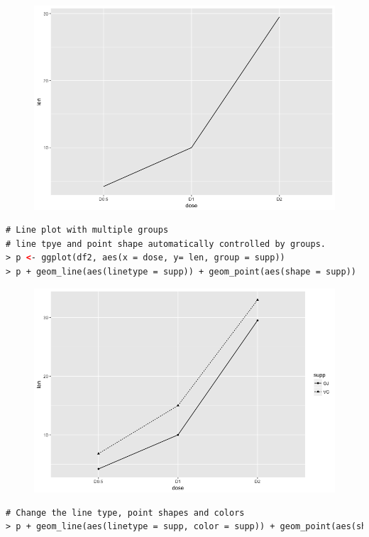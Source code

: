 \begin{figure}[H]\begin{center}\includegraphics[scale=1 ]{ilu/bg122.png}\end{center}\end{figure}
\begin{lstlisting}[language=html]
# Line plot with multiple groups
# line tpye and point shape automatically controlled by groups.
> p <- ggplot(df2, aes(x = dose, y= len, group = supp))
> p + geom_line(aes(linetype = supp)) + geom_point(aes(shape = supp))
\end{lstlisting}
\begin{figure}[H]\begin{center}\includegraphics[scale=1 ]{ilu/bg123.png}\end{center}\end{figure}
\begin{lstlisting}[language=html]
# Change the line type, point shapes and colors
> p + geom_line(aes(linetype = supp, color = supp)) + geom_point(aes(shape = supp, color = supp)) + scale_color_brewer(palette = "Dark2")
\end{lstlisting}
